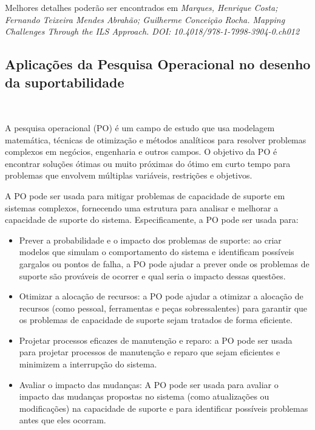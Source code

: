\documentclass{amsart}
\begin{document}
Melhores detalhes poderão ser encontrados em {\it Marques, Henrique Costa; Fernando Teixeira Mendes Abrahão; Guilherme Conceição Rocha. Mapping Challenges Through the ILS Approach. DOI: 10.4018/978-1-7998-3904-0.ch012}

\subsection{Aplicações da Pesquisa Operacional no desenho da suportabilidade}\

A pesquisa operacional (PO) é um campo de estudo que usa modelagem matemática, técnicas de otimização e métodos analíticos para resolver problemas complexos em negócios, engenharia e outros campos. O objetivo da PO é encontrar soluções ótimas ou muito próximas do ótimo em curto tempo para problemas que envolvem múltiplas variáveis, restrições e objetivos.

A PO pode ser usada para mitigar problemas de capacidade de suporte em sistemas complexos, fornecendo uma estrutura para analisar e melhorar a capacidade de suporte do sistema. Especificamente, a PO pode ser usada para:

\begin{itemize}
	
\item Prever a probabilidade e o impacto dos problemas de suporte: ao criar modelos que simulam o comportamento do sistema e identificam possíveis gargalos ou pontos de falha, a PO pode ajudar a prever onde os problemas de suporte são prováveis de ocorrer e qual seria o impacto dessas questões.

\item Otimizar a alocação de recursos: a PO pode ajudar a otimizar a alocação de recursos (como pessoal, ferramentas e peças sobressalentes) para garantir que os problemas de capacidade de suporte sejam tratados de forma eficiente.

\item Projetar processos eficazes de manutenção e reparo: a PO pode ser usada para projetar processos de manutenção e reparo que sejam eficientes e minimizem a interrupção do sistema.

\item Avaliar o impacto das mudanças: A PO pode ser usada para avaliar o impacto das mudanças propostas no sistema (como atualizações ou modificações) na capacidade de suporte e para identificar possíveis problemas antes que eles ocorram.

\end{itemize}
\end{document}
